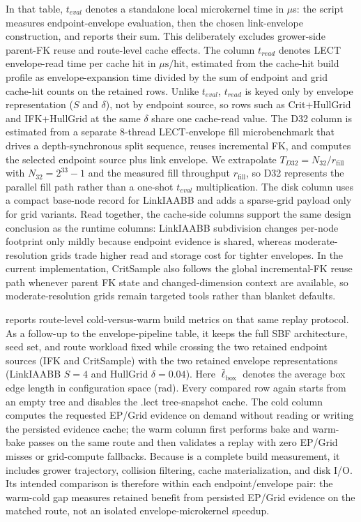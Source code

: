 \documentclass[journal]{IEEEtran}
\begin{document}
In that table, $t_{eval}$ denotes a standalone local microkernel time in $\mu$s:
the script measures endpoint-envelope evaluation, then the chosen link-envelope
construction, and reports their sum. This deliberately excludes grower-side
parent-FK reuse and route-level cache effects. The column $t_{read}$ denotes
LECT envelope-read time per cache hit in $\mu\mathrm{s}/\mathrm{hit}$,
estimated from the cache-hit build profile as envelope-expansion time divided by
the sum of endpoint and grid cache-hit counts on the retained rows. Unlike
$t_{eval}$, $t_{read}$ is keyed only by envelope representation ($S$ and
$\delta$), not by endpoint source, so rows such as Crit+HullGrid and
IFK+HullGrid at the same $\delta$ share one cache-read value. The D32 column is
estimated from a separate 8-thread LECT-envelope fill microbenchmark that drives
a depth-synchronous split sequence, reuses incremental FK, and computes the
selected endpoint source plus link envelope. We extrapolate
$T_{D32}=N_{32}/r_{\mathrm{fill}}$ with $N_{32}=2^{33}-1$ and the measured fill
throughput $r_{\mathrm{fill}}$, so D32 represents the parallel fill path rather
than a one-shot $t_{eval}$ multiplication. The disk column uses a compact
base-node record for LinkIAABB and adds a sparse-grid payload only for grid
variants. Read together, the cache-side columns support the same design
conclusion as the runtime columns: LinkIAABB subdivision changes per-node
footprint only mildly because endpoint evidence is shared, whereas
moderate-resolution grids trade higher read and storage cost for tighter
envelopes. In the current implementation, CritSample also follows the global
incremental-FK reuse path whenever parent FK state and changed-dimension context
are available, so moderate-resolution grids remain targeted tools rather than
blanket defaults.

 reports route-level cold-versus-warm build
metrics on that same replay protocol. As a follow-up to the envelope-pipeline
table, it keeps the full SBF architecture, seed set, and route workload fixed
while crossing the two retained endpoint sources (IFK and CritSample) with the
two retained envelope representations (LinkIAABB $S=4$ and HullGrid
$\delta=0.04$). Here $\bar{\ell}_{\mathrm{box}}$ denotes the average box edge
length in configuration space (rad). Every compared row again starts from an
empty tree and disables the .lect tree-snapshot cache. The cold column computes
the requested EP/Grid evidence on demand without reading or writing the
persisted evidence cache; the warm column first performs bake and warm-bake
passes on the same route and then validates a replay with zero EP/Grid misses
or grid-compute fallbacks. Because  is a complete build measurement,
it includes grower trajectory, collision filtering, cache materialization, and
disk I/O. Its intended comparison is therefore within each endpoint/envelope
pair: the warm-cold gap measures retained benefit from persisted EP/Grid
evidence on the matched route, not an isolated envelope-microkernel speedup.
\end{document}
